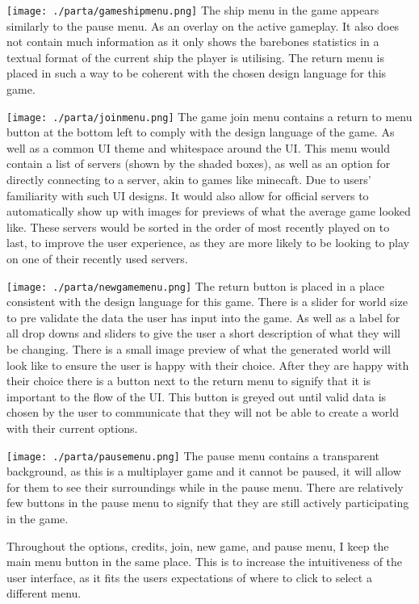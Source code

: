 \documentclass[12pt, DIV=calc]{scrartcl}
\begin{document}
\texttt{[image: ./parta/gameshipmenu.png]}
The ship menu in the game appears similarly to the pause menu. As an overlay on the active gameplay. It also does not contain much information as it only shows the barebones statistics in a textual format of the current ship the player is utilising. The return menu is placed in such a way to be coherent with the chosen design language for this game.

\texttt{[image: ./parta/joinmenu.png]}
The game join menu contains a return to menu button at the bottom left to comply with the design language of the game. As well as a common UI theme and whitespace around the UI. This menu would contain a list of servers (shown by the shaded boxes), as well as an option for directly connecting to a server, akin to games like minecaft. Due to users' familiarity with such UI designs. It would also allow for official servers to automatically show up with images for previews of what the average game looked like. These servers would be sorted in the order of most recently played on to last, to improve the user experience, as they are more likely to be looking to play on one of their recently used servers.

\texttt{[image: ./parta/newgamemenu.png]}
The return button is placed in a place consistent with the design language for this game. There is a slider for world size to pre validate the data the user has input into the game. As well as a label for all drop downs and sliders to give the user a short description of what they will be changing. There is a small image preview of what the generated world will look like to ensure the user is happy with their choice. After they are happy with their choice there is a button next to the return menu to signify that it is important to the flow of the UI. This button is greyed out until valid data is chosen by the user to communicate that they will not be able to create a world with their current options.

\texttt{[image: ./parta/pausemenu.png]}
The pause menu contains a transparent background, as this is a multiplayer game and it cannot be paused, it will allow for them to see their surroundings while in the pause menu. There are relatively few buttons in the pause menu to signify that they are still actively participating in the game.

Throughout the options, credits, join, new game, and pause menu, I keep the main menu button in the same place. This is to increase the intuitiveness of the user interface, as it fits the users expectations of where to click to select a different menu.
\end{document}
